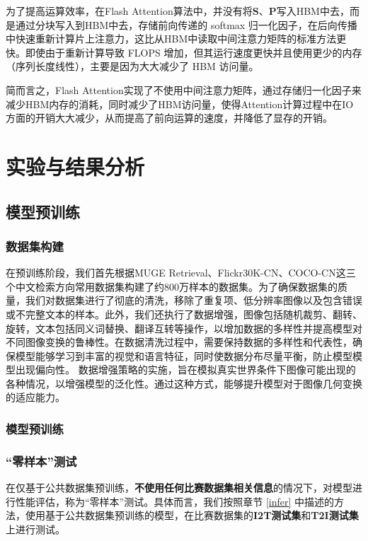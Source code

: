 \documentclass[a4paper]{zreport}
\begin{document}
为了提高运算效率，在Flash Attention算法中，并没有将$\mathbf{S}\text{、}\mathbf{P}$写入HBM中去，而是通过分块写入到HBM中去，存储前向传递的 softmax 归一化因子，在后向传播中快速重新计算片上注意力，这比从HBM中读取中间注意力矩阵的标准方法更快。即使由于重新计算导致 FLOPS 增加，但其运行速度更快并且使用更少的内存（序列长度线性），主要是因为大大减少了 HBM 访问量。

简而言之，Flash Attention实现了不使用中间注意力矩阵，通过存储归一化因子来减少HBM内存的消耗，同时减少了HBM访问量，使得Attention计算过程中在IO方面的开销大大减少，从而提高了前向运算的速度，并降低了显存的开销。

\section{实验与结果分析}

\subsection{模型预训练}

\subsubsection{数据集构建}
在预训练阶段，我们首先根据MUGE Retrieval、Flickr30K-CN、COCO-CN这三个中文检索方向常用数据集构建了约800万样本的数据集。为了确保数据集的质量，我们对数据集进行了彻底的清洗，移除了重复项、低分辨率图像以及包含错误或不完整文本的样本。此外，我们还执行了数据增强，图像包括随机裁剪、翻转、旋转，文本包括同义词替换、翻译互转等操作，以增加数据的多样性并提高模型对不同图像变换的鲁棒性。在数据清洗过程中，需要保持数据的多样性和代表性，确保模型能够学习到丰富的视觉和语言特征，同时使数据分布尽量平衡，防止模型模型出现偏向性。
数据增强策略的实施，旨在模拟真实世界条件下图像可能出现的各种情况，以增强模型的泛化性。通过这种方式，能够提升模型对于图像几何变换的适应能力。


\subsubsection{模型预训练}



\subsubsection{“零样本”测试}

在仅基于公共数据集预训练，\textbf{不使用任何比赛数据集相关信息}的情况下，对模型进行性能评估，称为“零样本”测试。具体而言，我们按照章节 \ref{infer} 中描述的方法，使用基于公共数据集预训练的模型，在比赛数据集的\textbf{I2T测试集}和\textbf{T2I测试集}上进行测试。
\end{document}
